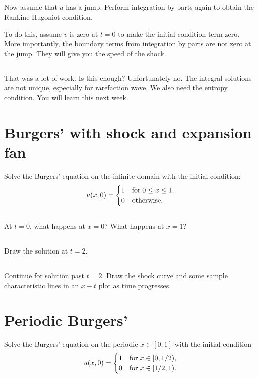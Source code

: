 \documentclass[11pt,letterpaper]{report}
\begin{document}
\subsection{}
Now assume that $u$ has a jump. Perform integration by parts again to obtain the Rankine-Hugoniot condition.

To do this, assume $v$ is zero at $t=0$ to make the initial condition term zero. More importantly, the boundary terms from integration by parts are not zero at the jump. They will give you the speed of the shock.

\subsection{}
That was a lot of work. Is this enough? Unfortunately no. The integral solutions are not unique, especially for rarefaction wave. We also need the entropy condition. You will learn this next week.

\section{Burgers' with shock and expansion fan}
Solve the Burgers' equation on the infinite domain with the initial condition:
\begin{align}
    u(x,0) = \begin{cases}
        1 & \text{for\;} 0\leq x\leq 1,\\
        0 & \text{otherwise}.
    \end{cases}
\end{align}

\subsection{}
At $t=0$, what happens at $x=0$? What happens at $x=1$?

\subsection{}
Draw the solution at $t=2$. 

\subsection{}
Continue for solution past $t=2$. Draw the shock curve and some sample characteristic lines in an $x-t$ plot as time progresses. 

\section{Periodic Burgers'}
Solve the Burgers' equation on the periodic $x\in[0,1]$ with the initial condition
\begin{align}
    u(x,0) = \begin{cases}
        1 & \text{for\;} x\in[0,1/2),\\
        0 & \text{for\;} x\in[1/2,1).
    \end{cases}
\end{align}
\end{document}
